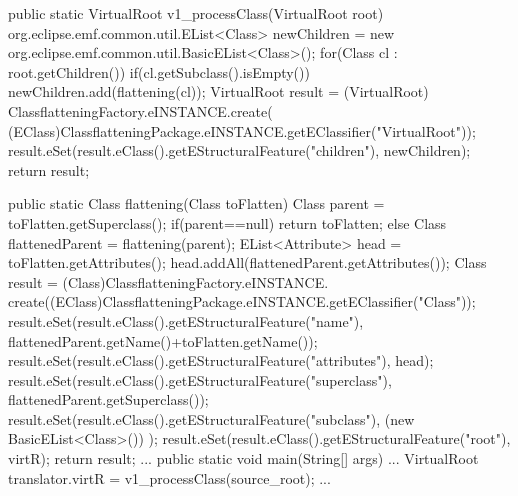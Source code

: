 \begin{codesource}[label=code:v1flattening,caption=Version 1 : Implémentation de la transformation d'aplatissement de hiérarchie de classes en Java.]
public static VirtualRoot v1_processClass(VirtualRoot root) {
  org.eclipse.emf.common.util.EList<Class> newChildren =
    new org.eclipse.emf.common.util.BasicEList<Class>();
  for(Class cl : root.getChildren()) {
    if(cl.getSubclass().isEmpty()) {
      newChildren.add(flattening(cl));
    }
  }
  VirtualRoot result = (VirtualRoot) ClassflatteningFactory.eINSTANCE.create(
                          (EClass)ClassflatteningPackage.eINSTANCE.getEClassifier("VirtualRoot"));
  result.eSet(result.eClass().getEStructuralFeature("children"), newChildren);
  return result;
}

public static Class flattening(Class toFlatten) {
  Class parent = toFlatten.getSuperclass();
  if(parent==null) {
    return toFlatten;
  } else {
    Class flattenedParent = flattening(parent);
    EList<Attribute> head = toFlatten.getAttributes();
    head.addAll(flattenedParent.getAttributes());
    Class result = (Class)ClassflatteningFactory.eINSTANCE.
                      create((EClass)ClassflatteningPackage.eINSTANCE.getEClassifier("Class"));
    result.eSet(result.eClass().getEStructuralFeature("name"), flattenedParent.getName()+toFlatten.getName());
    result.eSet(result.eClass().getEStructuralFeature("attributes"), head);
    result.eSet(result.eClass().getEStructuralFeature("superclass"), flattenedParent.getSuperclass());
    result.eSet(result.eClass().getEStructuralFeature("subclass"), (new BasicEList<Class>()) );
    result.eSet(result.eClass().getEStructuralFeature("root"), virtR);
    return result;
  }
}
...
public static void main(String[] args) {
  ...
  VirtualRoot translator.virtR = v1_processClass(source_root);
  ...
}
\end{codesource}
